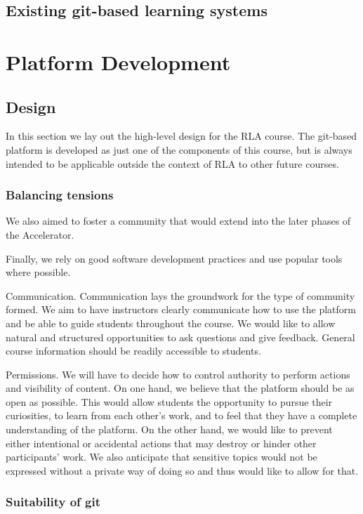 \documentclass[12pt,twoside,vi]{mitthesis}
\begin{document}
\section{Existing git-based learning systems}

\chapter{Platform Development}

\section{Design}

In this section we lay out the high-level design for the RLA course. The git-based platform is developed as just one of the components of this course, but is always intended to be applicable outside the context of RLA to other future courses.

\subsection{Balancing tensions}

We also aimed to foster a community that would extend into the later phases of the Accelerator. 

Finally, we rely on good software development practices and use popular tools where possible.

Communication. Communication lays the groundwork for the type of community formed. We aim to have instructors clearly communicate how to use the platform and be able to guide students throughout the course. We would like to allow natural and structured opportunities to ask questions and give feedback. General course information should be readily accessible to students.

Permissions. We will have to decide how to control authority to perform actions and visibility of content. On one hand, we believe that the platform should be as open as possible. This would allow students the opportunity to pursue their curiosities, to learn from each other’s work, and to feel that they have a complete understanding of the platform. On the other hand, we would like to prevent either intentional or accidental actions that may destroy or hinder other participants’ work. We also anticipate that sensitive topics would not be expressed without a private way of doing so and thus would like to allow for that.

\subsection{Suitability of git}
\end{document}
